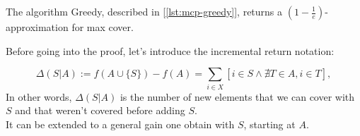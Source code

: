 \begin{thm}\label{thm:mcp-greedy}
    The algorithm Greedy, described in [\ref{lst:mcp-greedy}], returns a $\left(1-\frac{1}{e}\right)$-approximation for max cover.
\end{thm}
Before going into the proof, let's introduce the incremental return notation:
\begin{defn}\label{def:incremental-gain}
    \begin{equation}\label{eq:mcp-dsa}
        \Delta(S|A) := f(A \cup \{S\}) - f(A) = \sum_{i \in X} [i \in S \wedge \nexists T \in A, i \in T],
    \end{equation}
    In other words, $\Delta(S|A)$ is the number of new elements that we can cover with $S$ and that weren't covered before adding $S$.\\ It can be extended to a general gain one obtain with $S$, starting at $A$.
\end{defn}
